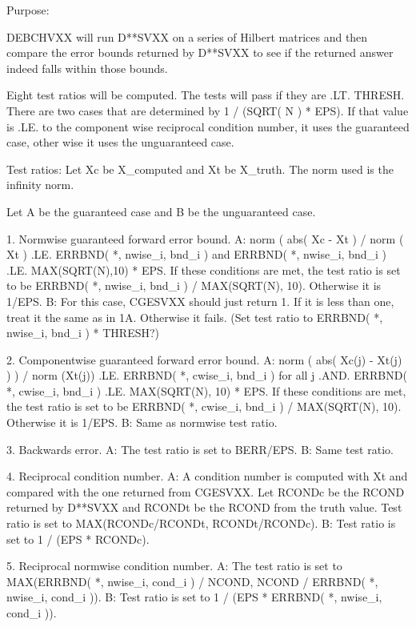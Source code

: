\begin{DoxyParagraph}{Purpose\+: }
\begin{DoxyVerb}  DEBCHVXX will run D**SVXX on a series of Hilbert matrices and then
  compare the error bounds returned by D**SVXX to see if the returned
  answer indeed falls within those bounds.

  Eight test ratios will be computed.  The tests will pass if they are .LT.
  THRESH.  There are two cases that are determined by 1 / (SQRT( N ) * EPS).
  If that value is .LE. to the component wise reciprocal condition number,
  it uses the guaranteed case, other wise it uses the unguaranteed case.

  Test ratios:
     Let Xc be X_computed and Xt be X_truth.
     The norm used is the infinity norm.

     Let A be the guaranteed case and B be the unguaranteed case.

       1. Normwise guaranteed forward error bound.
       A: norm ( abs( Xc - Xt ) / norm ( Xt ) .LE. ERRBND( *, nwise_i, bnd_i ) and
          ERRBND( *, nwise_i, bnd_i ) .LE. MAX(SQRT(N),10) * EPS.
          If these conditions are met, the test ratio is set to be
          ERRBND( *, nwise_i, bnd_i ) / MAX(SQRT(N), 10).  Otherwise it is 1/EPS.
       B: For this case, CGESVXX should just return 1.  If it is less than
          one, treat it the same as in 1A.  Otherwise it fails. (Set test
          ratio to ERRBND( *, nwise_i, bnd_i ) * THRESH?)

       2. Componentwise guaranteed forward error bound.
       A: norm ( abs( Xc(j) - Xt(j) ) ) / norm (Xt(j)) .LE. ERRBND( *, cwise_i, bnd_i )
          for all j .AND. ERRBND( *, cwise_i, bnd_i ) .LE. MAX(SQRT(N), 10) * EPS.
          If these conditions are met, the test ratio is set to be
          ERRBND( *, cwise_i, bnd_i ) / MAX(SQRT(N), 10).  Otherwise it is 1/EPS.
       B: Same as normwise test ratio.

       3. Backwards error.
       A: The test ratio is set to BERR/EPS.
       B: Same test ratio.

       4. Reciprocal condition number.
       A: A condition number is computed with Xt and compared with the one
          returned from CGESVXX.  Let RCONDc be the RCOND returned by D**SVXX
          and RCONDt be the RCOND from the truth value.  Test ratio is set to
          MAX(RCONDc/RCONDt, RCONDt/RCONDc).
       B: Test ratio is set to 1 / (EPS * RCONDc).

       5. Reciprocal normwise condition number.
       A: The test ratio is set to
          MAX(ERRBND( *, nwise_i, cond_i ) / NCOND, NCOND / ERRBND( *, nwise_i, cond_i )).
       B: Test ratio is set to 1 / (EPS * ERRBND( *, nwise_i, cond_i )).


\end{DoxyVerb}
\end{DoxyParagraph}
